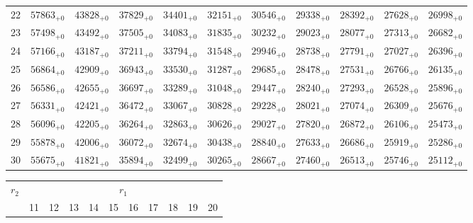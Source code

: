\documentclass[10pt, a4paper]{article}
\begin{document}
\begin{center}
\begin{tabular}{c || c c c c c | c c c c c}
        22 & \({57863}_{+0}\) & \({43828}_{+0}\) & \({37829}_{+0}\) & \({34401}_{+0}\) & \({32151}_{+0}\) & \({30546}_{+0}\) & \({29338}_{+0}\) & \({28392}_{+0}\) & \({27628}_{+0}\) & \({26998}_{+0}\)\\
        23 & \({57498}_{+0}\) & \({43492}_{+0}\) & \({37505}_{+0}\) & \({34083}_{+0}\) & \({31835}_{+0}\) & \({30232}_{+0}\) & \({29023}_{+0}\) & \({28077}_{+0}\) & \({27313}_{+0}\) & \({26682}_{+0}\)\\
        24 & \({57166}_{+0}\) & \({43187}_{+0}\) & \({37211}_{+0}\) & \({33794}_{+0}\) & \({31548}_{+0}\) & \({29946}_{+0}\) & \({28738}_{+0}\) & \({27791}_{+0}\) & \({27027}_{+0}\) & \({26396}_{+0}\)\\
        25 & \({56864}_{+0}\) & \({42909}_{+0}\) & \({36943}_{+0}\) & \({33530}_{+0}\) & \({31287}_{+0}\) & \({29685}_{+0}\) & \({28478}_{+0}\) & \({27531}_{+0}\) & \({26766}_{+0}\) & \({26135}_{+0}\)\\
        \hline
        26 & \({56586}_{+0}\) & \({42655}_{+0}\) & \({36697}_{+0}\) & \({33289}_{+0}\) & \({31048}_{+0}\) & \({29447}_{+0}\) & \({28240}_{+0}\) & \({27293}_{+0}\) & \({26528}_{+0}\) & \({25896}_{+0}\)\\
        27 & \({56331}_{+0}\) & \({42421}_{+0}\) & \({36472}_{+0}\) & \({33067}_{+0}\) & \({30828}_{+0}\) & \({29228}_{+0}\) & \({28021}_{+0}\) & \({27074}_{+0}\) & \({26309}_{+0}\) & \({25676}_{+0}\)\\
        28 & \({56096}_{+0}\) & \({42205}_{+0}\) & \({36264}_{+0}\) & \({32863}_{+0}\) & \({30626}_{+0}\) & \({29027}_{+0}\) & \({27820}_{+0}\) & \({26872}_{+0}\) & \({26106}_{+0}\) & \({25473}_{+0}\)\\
        29 & \({55878}_{+0}\) & \({42006}_{+0}\) & \({36072}_{+0}\) & \({32674}_{+0}\) & \({30438}_{+0}\) & \({28840}_{+0}\) & \({27633}_{+0}\) & \({26686}_{+0}\) & \({25919}_{+0}\) & \({25286}_{+0}\)\\
        30 & \({55675}_{+0}\) & \({41821}_{+0}\) & \({35894}_{+0}\) & \({32499}_{+0}\) & \({30265}_{+0}\) & \({28667}_{+0}\) & \({27460}_{+0}\) & \({26513}_{+0}\) & \({25746}_{+0}\) & \({25112}_{+0}\)\\
        \hline
    \end{tabular}
    \pagebreak
    \begin{tabular}{c || c c c c c | c c c c c}
        \multirow{2}{*}{\(r_2\)} & \multicolumn{10}{c}{\(r_1\)} \\
        & 11 & 12 & 13 & 14 & 15 & 16 & 17 & 18 & 19 & 20\\
        \hline\hline

\end{tabular}
\end{center}
\end{document}
